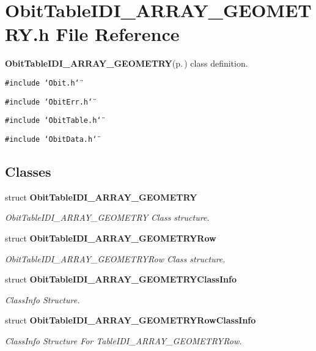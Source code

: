 \section{Obit\-Table\-IDI\_\-ARRAY\_\-GEOMETRY.h File Reference}
\label{ObitTableIDI__ARRAY__GEOMETRY_8h}
{\bf Obit\-Table\-IDI\_\-ARRAY\_\-GEOMETRY}{\rm (p.\,\pageref{structObitTableIDI__ARRAY__GEOMETRY})} class definition. 

{\tt \#include \char`\"{}Obit.h\char`\"{}}\par
{\tt \#include \char`\"{}Obit\-Err.h\char`\"{}}\par
{\tt \#include \char`\"{}Obit\-Table.h\char`\"{}}\par
{\tt \#include \char`\"{}Obit\-Data.h\char`\"{}}\par
\subsection*{Classes}
\begin{CompactItemize}
\item 
struct {\bf Obit\-Table\-IDI\_\-ARRAY\_\-GEOMETRY}
\begin{CompactList}\small\item\em Obit\-Table\-IDI\_\-ARRAY\_\-GEOMETRY Class structure. \item\end{CompactList}\item 
struct {\bf Obit\-Table\-IDI\_\-ARRAY\_\-GEOMETRYRow}
\begin{CompactList}\small\item\em Obit\-Table\-IDI\_\-ARRAY\_\-GEOMETRYRow Class structure. \item\end{CompactList}\item 
struct {\bf Obit\-Table\-IDI\_\-ARRAY\_\-GEOMETRYClass\-Info}
\begin{CompactList}\small\item\em Class\-Info Structure. \item\end{CompactList}\item 
struct {\bf Obit\-Table\-IDI\_\-ARRAY\_\-GEOMETRYRow\-Class\-Info}
\begin{CompactList}\small\item\em Class\-Info Structure For Table\-IDI\_\-ARRAY\_\-GEOMETRYRow. \item\end{CompactList}\end{CompactItemize}
